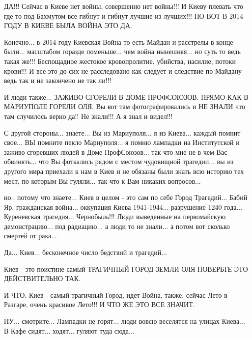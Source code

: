 ДА!!! Сейчас в Киеве нет войны, совершенно нет войны!!! И Киеву плевать что где то 
под Бахмутом все гибнут и гибнут лучшие из лучших!!! НО ВОТ В 2014 ГОДУ В КИЕВЕ БЫЛА ВОЙНА
ЭТО ДА.

Конечно... в 2014 году Киевская Война то есть Майдан и расстрелы в конце
были... масштабом горазде поменьше... чем война нынешняя... но суть то ведь
такая же!!! Беспощадное жестокое кровопролитие, убийства, насилие, потоки
крови!!! И все это до сих не расследовано как следует и следствие по Майдану
ведь так и не закончено не так ли!!!

И люди также... ЗАЖИВО СГОРЕЛИ В ДОМЕ ПРОФСОЮЗОВ. ПРЯМО КАК В МАРИУПОЛЕ ГОРЕЛИ ОЛЯ.
Вы вот там фотографировались и НЕ ЗНАЛИ что там случилось верно да!! Не знали!!!
А я знал и видел!!! 

С другой стороны... знаете... Вы из Мариуполя... я из Киева... каждый помнит свое...
ВЫ помните пекло Мариуполя... я помню лампадки на Институтской и заживо сгоревших людей в Доме 
ПрофСоюзов... так что мне не в чем Вас обвинять... что Вы фоткались рядом с местом чудовищной трагедии...
вы из другого мира приехали к нам в Киев и не обязаны были знать всю историю тех мест, по которым Вы гуляли...
так что к Вам никаких вопросов...

но.. потому что знаете... Киев в целом - это сам по себе Город Трагедий... Бабий Яр, гражданская война... оккупация Киева 1941-1944...
разрушение 1240 года... Куреневская трагедия... Чернобыль!!! Люди выведенные на первомайскую демонстрацию...
под радиацию... а люди то не знали... а потом вот сколько смертей от рака... 

Да... Киев... бесконечное число бедствий и трагедий... 

Киев - это поистине самый ТРАГИЧНЫЙ ГОРОД ЗЕМЛИ ОЛЯ ПОВЕРЬТЕ ЭТО ДЕЙСТВИТЕЛЬНО ТАК.

И ЧТО. Киев - самый трагичный Город, идет Война, также, сейчас Лето в Разгаре, очень красивое Лето!!!
И ЧТО ЖЕ ЭТО ВСЕ ЗНАЧИТ.

НУ... смотрите... Лампадки не горят... люди вовсю веселятся на улицах Киева... В Кафе сидят... ходят...
гуляют туда сюда... 
